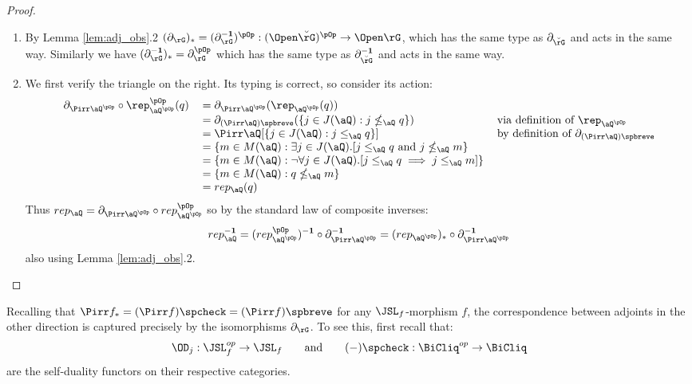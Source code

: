\documentclass{article}
\begin{document}
\begin{proof}
\item
\begin{enumerate}
\item
By Lemma \ref{lem:adj_obs}.2 $(\partial_{\rG})_* = (\partial_{\rG}^{\bf-1})^{\pOp} : (\Open\breve{\rG})^{\pOp} \to \Open\rG$, which has the same type as $\partial_{\breve{\rG}}$ and acts in the same way. Similarly we have $(\partial_\rG^{\bf-1})_* = \partial_\rG^{\pOp}$ which has the same type as $\partial_{\breve{\rG}}^{\bf-1}$ and acts in the same way.

\item
We first verify the triangle on the right. Its typing is correct, so consider its action:
\[
\begin{tabular}{lll}
$\partial_{\Pirr\aQ^{\pOp}} \circ \rep_{\aQ^{\pOp}}^{\pOp}(q)$
&
$= \partial_{\Pirr\aQ^{\pOp}}(\rep_{\aQ^{\pOp}}(q))$
\\&
$= \partial_{(\Pirr\aQ)\spbreve}(\{ j \in J(\aQ) : j \nleq_\aQ q \})$
& via definition of $\rep_{\aQ^{\pOp}}$
\\&
$= \Pirr\aQ[\{ j \in J(\aQ) : j \leq_\aQ q \}]$
& by definition of $\partial_{(\Pirr\aQ)\spbreve}$
\\&
$= \{ m \in M(\aQ): \exists j \in J(\aQ).[j \leq_\aQ q \text{ and }  j \nleq_\aQ m \}$
\\&
$= \{ m \in M(\aQ) : \neg\forall j \in J(\aQ).[j \leq_\aQ q \implies j \leq_\aQ m  ] \}$
\\&
$= \{ m \in M(\aQ) : q \nleq_\aQ m \}$
\\&
$= rep_\aQ(q)$
\end{tabular}
\]
Thus $rep_\aQ = \partial_{\Pirr\aQ^{\pOp}} \circ rep_{\aQ^{\pOp}}^{\pOp}$ so by the standard law of composite inverses: 
\[
rep_\aQ^{\bf-1}
= (rep_{\aQ^{\pOp}}^{\pOp})^{\bf-1} \circ \partial_{\Pirr\aQ^{\pOp}}^{\bf-1}
= (rep_{\aQ^{\pOp}})_* \circ \partial_{\Pirr\aQ^{\pOp}}^{\bf-1}
\]
also using Lemma \ref{lem:adj_obs}.2.
\end{enumerate}
\end{proof}

Recalling that $\Pirr f_* = (\Pirr f)\spcheck = (\Pirr f)\spbreve$ for any $\JSL_f$-morphism $f$, the correspondence between adjoints in the other direction is captured precisely by the isomorphisms $\partial_\rG$. To see this, first recall that:
\[
\OD_j : \JSL_f^{op} \to \JSL_f
\qquad\text{and}\qquad
(-)\spcheck : \BiCliq^{op} \to \BiCliq
\]
are the self-duality functors on their respective categories.
\end{document}
